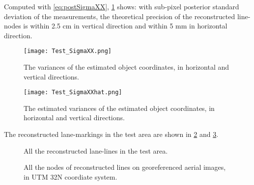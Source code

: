 Computed with \cref{eq:postSigmaXX}, \cref{fig:TestSigmxxhat} shows: with sub-pixel posterior standard deviation of the measurements, the theoretical precision of the reconstructed line-nodes is within 2.5 cm in vertical direction and within 5 mm in horizontal direction. 

\begin{figure}
  \centering
  \texttt{[image: Test\_SigmaXX.png]}
  \caption{\small The variances of the estimated object coordinates, in horizontal and vertical directions.}
  \label{fig:TestSigmxx}
  \vspace{0.5cm}
  \centering
  \texttt{[image: Test\_SigmaXXhat.png]}
  \caption{\small The estimated variances of the estimated object coordinates, in horizontal and vertical directions.}
  \label{fig:TestSigmxxhat}
\end{figure}

\vspace{1cm}
The reconstructed lane-markings in the test area are shown in \cref{fig:TestAll3D} and \cref{fig:TestAll2D}. 

\begin{figure}
	\centering
	
	\caption{\small All the reconstructed lane-lines in the test area.}
	\label{fig:TestAll3D}
\end{figure}

\begin{figure}
	\centering
	
	
	\caption{\small All the nodes of reconstructed lines on georeferenced aerial images, in UTM 32N coordiate system.}
	\label{fig:TestAll2D}
\end{figure}

